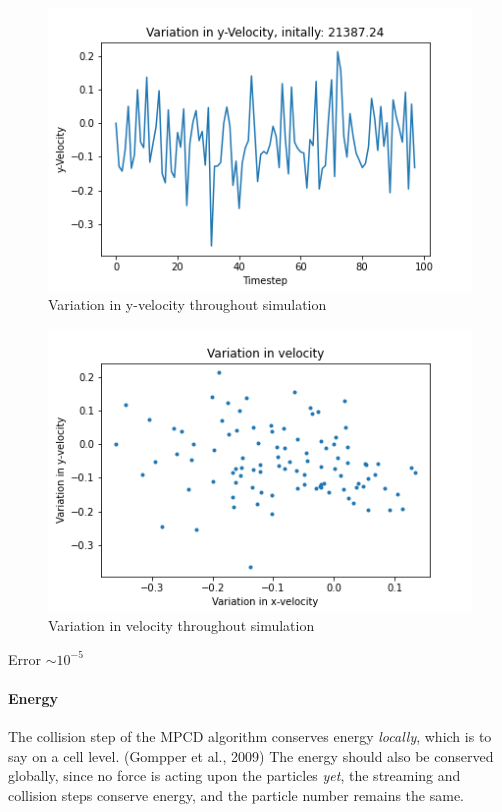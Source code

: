 \documentclass[
]{article}
\begin{document}
\begin{figure}
\centering
\includegraphics{Assets/y_velocity_variation.png}
\caption{Variation in y-velocity throughout simulation}
\end{figure}

\begin{figure}
\centering
\includegraphics{Assets/velocity_variation.png}
\caption{Variation in velocity throughout simulation}
\end{figure}

Error \(\sim 10^{-5}\)

\hypertarget{energy}{%
\paragraph{Energy}\label{energy}}

The collision step of the MPCD algorithm conserves energy
\emph{locally}, which is to say on a cell level. (Gompper et al., 2009)
The energy should also be conserved globally, since no force is acting
upon the particles \emph{yet}, the streaming and collision steps
conserve energy, and the particle number remains the same.
\end{document}
